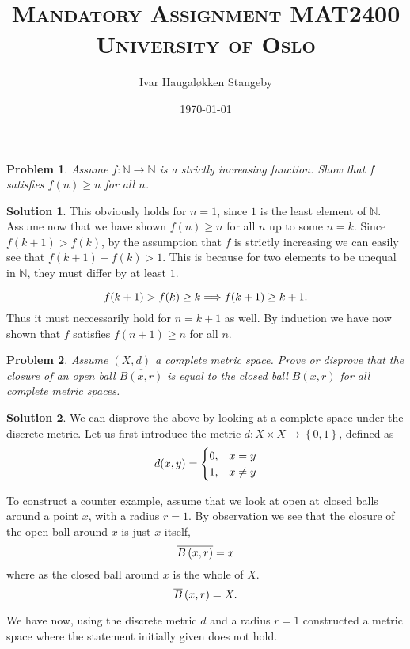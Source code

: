 \documentclass[a4paper]{article}
\title{
  \huge{\textsc{Mandatory Assignment  MAT2400}} \\
  \textsc{University of Oslo}
}
\author{Ivar Haugaløkken Stangeby}
\date{\today}
\newtheorem{prb}{Problem}
\theoremstyle{definition}
\newtheorem{sol}{Solution}
\begin{document}
\maketitle
\begin{prb}
  Assume $f : \mathbb{N} \rightarrow \mathbb{N}$ is a strictly increasing function.
  Show that $f$ satisfies $f(n) \geq n$ for all $n$.
\end{prb}

\begin{sol}
This obviously holds for $n = 1$, since $1$ is the least element of
$\mathbb{N}$.  Assume now that we have shown $f(n) \geq n$ for all $n$ up to
some $n = k$.  Since $f(k+1) > f(k)$, by the assumption that $f$ is strictly
increasing we can easily see that $f(k+1) - f(k) > 1$. This is because for two
elements to be unequal in $\mathbb{N}$, they must differ by at least $1$.

\begin{equation}
  \notag
  f(k+1) > f(k) \geq k \Longrightarrow f(k+1) \geq k + 1.
\end{equation}
Thus it must neccessarily hold for $n = k+1$ as well.
By induction we have now shown that $f$ satisfies $f(n+1) \geq n$ for all $n$.
\end{sol}

\begin{prb}
  Assume $\left( X, d \right)$ a complete metric space. Prove or disprove that the closure of
  an open ball $\overline{ B\left( x, r \right)}$ is equal to the closed ball
  $\overline{ B }\left( x, r \right)$ for all complete metric spaces.
\end{prb}

\begin{sol}
  We can disprove the above by looking at a complete space under the discrete metric.
  Let us first introduce the metric $d : X \times X \rightarrow \left\{ 0, 1 \right\}$, defined
  as
  \begin{equation}
    \notag
    d(x, y) = \begin{cases}
                0, & x = y \\
                1, & x \neq y
              \end{cases}
  \end{equation}

  To construct a counter example, assume that we look at open at closed balls
  around a point $x$, with a radius $r = 1$. By observation we see that the
  closure of the open ball around $x$ is just $x$ itself, 
  \begin{equation}
    \notag
    \overline{ B\left( x, r \right)} = x
  \end{equation}
  where as the closed ball around $x$ is the whole of $X$. 
  \begin{equation}
    \notag
    \overline{B}\left( x, r \right) = X.
  \end{equation}

  We have now, using the discrete metric $d$ and a radius $r = 1$ constructed a
  metric space where the statement initially given does not hold.
\end{sol}
\end{document}

